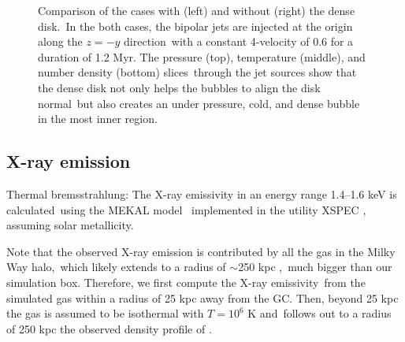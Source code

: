 \documentclass[twocolumn]{aastex631}
\begin{document}
\begin{figure}
    \caption{Comparison of the cases with (left) and without (right) the dense disk.\
             In the both cases, the bipolar jets are injected at the origin along the $z=-y$ direction\
             with a constant 4-velocity of 0.6 for a duration of 1.2 Myr.
             The pressure (top), temperature (middle), and number density (bottom) slices\
             through the jet sources show that the dense disk not only helps the bubbles to align the disk normal\
             but also creates an under pressure, cold, and dense bubble in the most inner region.
             }
    \label{fig__jetI5+ismSeed3-45deg_no-disk-stratified-ambient-Pres-Dens-Temp}
  \end{figure}


\subsection{X-ray emission}


Thermal bremsstrahlung: The X-ray emissivity in an energy range 1.4–1.6 keV is calculated\
using the MEKAL model \citep{Xray-1,Xray-2,Xray-3}\
implemented in the utility XSPEC \citep{XSPEC}, assuming solar metallicity.\

Note that the observed X-ray emission is contributed by all the gas in the Milky Way halo,\
which likely extends to a radius of $\sim$250 kpc \citep{halo-radius-1,halo-radius-2},\
much bigger than our simulation box. Therefore, we first compute the X-ray emissivity\
from the simulated gas within a radius of 25 kpc away from the GC.
Then, beyond 25 kpc the gas is assumed to be isothermal with $T=10^6$ K and\
follows out to a radius of 250 kpc the observed density profile of \citep{temperature-MW}.
\end{document}

